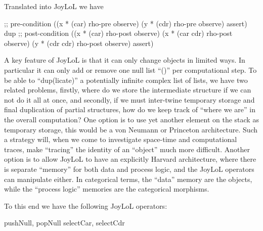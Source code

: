\documentclass[a4paper,openany]{amsart}
\begin{document}
\begin{prooftree}
\end{prooftree}

Translated into JoyLoL we have
%
\begin{racket}
;; pre-condition
((x * (car) rho-pre observe)
 (y * (cdr) rho-pre observe) assert)
dup
;; post-condition
((x * (car) rho-post observe)
 (x * (car cdr) rho-post observe)
 (y * (cdr cdr) rho-post observe) assert)
\end{racket}

A key feature of JoyLoL is that it can only change objects in limited ways. In
particular it can only add or remove one null list ``()'' per computational
step. To be able to ``dup(licate)'' a potentially infinite complex list of
lists, we have two related problems, firstly, where do we store the intermediate
structure if we can not do it all at once, and secondly, if we must inter-twine
temporary storage and final duplication of partial structures, how do we keep
track of ``where we are'' in the overall computation? One option is to use yet
another element on the stack as temporary storage, this would be a von Neumann
or Princeton architecture. Such a strategy will, when we come to investigate
space-time and computational traces, make ``tracing'' the identity of an
``object'' much more difficult. Another option is to allow JoyLoL to have an
explicitly Harvard architecture, where there is separate ``memory'' for both
data and process logic, and the JoyLoL operators can manipulate either. In
categorical terms, the ``data'' memory are the objects, while the ``process
logic'' memories are the categorical morphisms.

To this end we have the following JoyLoL operators:
%
\begin{racket}
pushNull, popNull
selectCar, selectCdr
\end{racket}

\printbibliography
\end{document}
